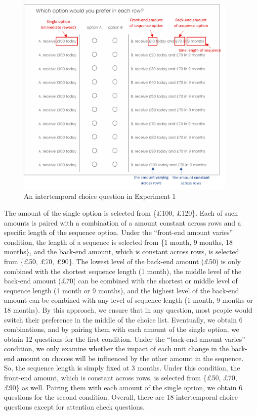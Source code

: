 \documentclass[
  12pt,
]{article}
\begin{document}
\begin{figure}   
  \vspace{16pt}   
  \centering   
  \includegraphics[width=0.96\textwidth]{figures/exp1_screenshot.png}   
  \caption{An intertemporal choice question in Experiment 1}  
  \label{fig:exp1_screenshot} 
\end{figure}

The amount of the single option is selected from \{£100, £120\}. Each of
such amounts is paired with a combination of a amount constant across
rows and a specific length of the sequence option. Under the ``front-end
amount varies'' condition, the length of a sequence is selected from \{1
month, 9 months, 18 months\}, and the back-end amount, which is constant
across rows, is selected from \{£50, £70, £90\}. The lowest level of the
back-end amount (£50) is only combined with the shortest sequence length
(1 month), the middle level of the back-end amount (£70) can be combined
with the shortest or middle level of sequence length (1 month or 9
months), and the highest level of the back-end amount can be combined
with any level of sequence length (1 month, 9 months or 18 months). By
this approach, we ensure that in any question, most people would switch
their preference in the middle of the choice list. Eventually, we obtain
6 combinations, and by pairing them with each amount of the single
option, we obtain 12 questions for the first condition. Under the
``back-end amount varies'' condition, we only examine whether the impact
of each unit change in the back-end amount on choices will be influenced
by the other amount in the sequence. So, the sequence length is simply
fixed at 3 months. Under this condition, the front-end amount, which is
constant across rows, is selected from \{£50, £70, £90\} as well.
Pairing them with each amount of the single option, we obtain 6
questions for the second condition. Overall, there are 18 intertemporal
choice questions except for attention check questions.
\end{document}
